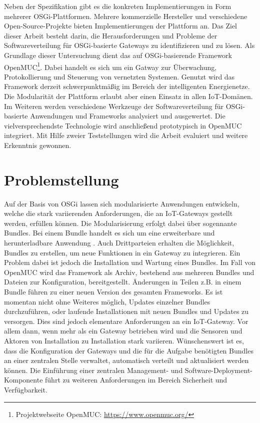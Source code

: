 Neben der Spezifikation gibt es die konkreten Implementierungen in Form mehrerer \ac{OSGi}-Plattformen. Mehrere kommerzielle Hersteller und verschiedene Open-Source-Projekte bieten
Implementierungen der Plattform an.
Das Ziel dieser Arbeit besteht darin, die Herausforderungen und Probleme der Softwareverteilung für \ac{OSGi}-basierte Gateways zu identifizieren und zu lösen.
Als Grundlage dieser Untersuchung dient das auf \ac{OSGi}-basierende Framework OpenMUC\footnote{Projektwebseite OpenMUC: \url{https://www.openmuc.org/}}. Dabei handelt es sich um ein Gatway zur Überwachung, Protokollierung und Steuerung von vernetzten Systemen.
Genutzt wird das Framework derzeit schwerpunktmäßig im Bereich der intelligenten Energienetze. Die Modularität der Plattform erlaubt aber einen Einsatz in allen \ac{IoT}-Domänen.
Im Weiteren werden verschiedene Werkzeuge der Softwareverteilung für \ac{OSGi}-basierte Anwendungen und Frameworks analysiert und ausgewertet. 
Die vielversprechendste Technologie wird anschließend prototypisch in OpenMUC integriert. 
Mit Hilfe zweier Teststellungen wird die Arbeit evaluiert und weitere Erkenntnis gewonnen.


\section{Problemstellung}
\label{sec:Problemstellung}
Auf der Basis von \ac{OSGi} lassen sich modularisierte Anwendungen entwickeln, welche die stark variierenden Anforderungen, die an \ac{IoT}-Gateways gestellt werden, erfüllen können.
Die Modularisierung erfolgt dabei über sogennante Bundles. Bei einem Bundle handelt es sich um eine erweiterbare und herunterladbare Anwendung \cite{osgi_r6}.
Auch Drittparteien erhalten die Möglichkeit, Bundles zu erstellen, um neue Funktionen in ein Gateway zu integrieren.
Ein Problem dabei ist jedoch die Installation und Wartung eines Bundles. Im Fall von OpenMUC wird das Framework als Archiv, bestehend aus mehreren Bundles und Dateien zur Konfiguration,
bereitgestellt. Änderungen in Teilen z.B. in einem Bundle führen zu einer neuen Version des gesamten Frameworks.
Es ist momentan nicht ohne Weiteres möglich, Updates einzelner Bundles durchzuführen, oder laufende Installationen mit neuen Bundles und Updates zu versorgen.
Dies sind jedoch elementare Anforderungen an ein \ac{IoT}-Gateway.
Vor allem dann, wenn mehr als ein Gateway betrieben wird und die Sensoren und Aktoren von Installation zu Installation stark variieren. 
Wünschenswert ist es, dass die Konfiguration der Gateways und die für die Aufgabe benötigten Bundles an einer zentralen Stelle verwaltet, automatisch verteilt und aktualisiert werden können. 
Die Einführung einer zentralen Management- und Software-Deployment-Komponente führt zu weiteren Anforderungen im Bereich Sicherheit und Verfügbarkeit.

